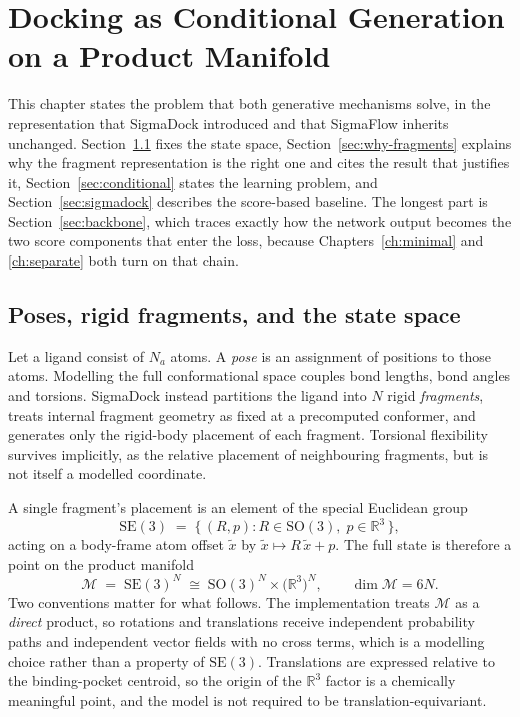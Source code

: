 \documentclass[11pt,a4paper]{report}
\theoremstyle{plain}
\theoremstyle{definition}
\theoremstyle{remark}
\newcommand{\R}{\mathbb{R}}
\newcommand{\SOthree}{\mathrm{SO}(3)}
\newcommand{\SEthree}{\mathrm{SE}(3)}
\newcommand{\Mfd}{\mathcal{M}}
\newcommand{\Rot}{R}
\begin{document}
\chapter{Docking as Conditional Generation on a Product Manifold}
\label{ch:problem}

This chapter states the problem that both generative mechanisms solve, in the
representation that SigmaDock introduced and that SigmaFlow inherits
unchanged. Section~\ref{sec:state-space} fixes the state space,
Section~\ref{sec:why-fragments} explains why the fragment representation is
the right one and cites the result that justifies it,
Section~\ref{sec:conditional} states the learning problem, and
Section~\ref{sec:sigmadock} describes the score-based baseline. The longest
part is Section~\ref{sec:backbone}, which traces exactly how the network
output becomes the two score components that enter the loss, because
Chapters~\ref{ch:minimal} and \ref{ch:separate} both turn on that chain.

\section{Poses, rigid fragments, and the state space}
\label{sec:state-space}

Let a ligand consist of $N_a$ atoms. A \emph{pose} is an assignment of
positions to those atoms. Modelling the full conformational space couples bond
lengths, bond angles and torsions. SigmaDock instead partitions the ligand
into $N$ rigid \emph{fragments}, treats internal fragment geometry as fixed at
a precomputed conformer, and generates only the rigid-body placement of each
fragment. Torsional flexibility survives implicitly, as the relative placement
of neighbouring fragments, but is not itself a modelled coordinate.

A single fragment's placement is an element of the special Euclidean group
\begin{equation}
  \SEthree \;=\; \bigl\{\, (\Rot, p) : \Rot \in \SOthree,\; p \in \R^3 \,\bigr\},
\end{equation}
acting on a body-frame atom offset $\tilde{x}$ by
$\tilde{x} \mapsto \Rot\,\tilde{x} + p$. The full state is therefore a point
on the product manifold
\begin{equation}
  \Mfd \;=\; \SEthree^{N}
  \;\cong\; \SOthree^{N} \times \bigl(\R^{3}\bigr)^{N},
  \qquad \dim \Mfd = 6N .
  \label{eq:state-space}
\end{equation}
Two conventions matter for what follows. The implementation treats $\Mfd$ as a
\emph{direct} product, so rotations and translations receive independent
probability paths and independent vector fields with no cross terms, which is
a modelling choice rather than a property of $\SEthree$. Translations are
expressed relative to the binding-pocket centroid, so the origin of the
$\R^{3}$ factor is a chemically meaningful point, and the model is not
required to be translation-equivariant.
\end{document}
